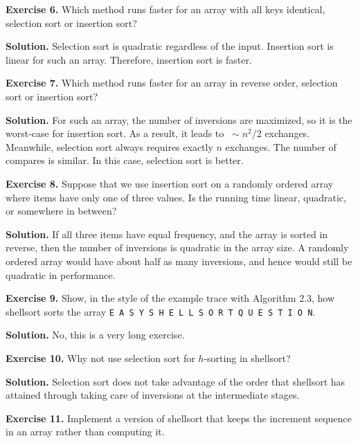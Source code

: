 \documentclass[12pt, a4paper]{article}
\newenvironment{ex}[2][Exercise]
{\par\medskip\noindent \textbf{#1 #2.}}
{\medskip}
\newenvironment{sol}[1][Solution]
{\par\medskip\noindent \textbf{#1.} }
{\medskip}
\begin{document}
	\begin{ex}{6}
		Which method runs faster for an array with all keys identical, selection sort or insertion sort?
	\end{ex}
	\begin{sol}
		Selection sort is quadratic regardless of the input. Insertion sort is linear for such
		an array. Therefore, insertion sort is faster.
	\end{sol}
	\begin{ex}{7}
		Which method runs faster for an array in reverse order, selection sort or insertion sort?
	\end{ex}
	\begin{sol}
		For such an array, the number of inversions are maximized, so it is the worst-case for
		insertion sort. As a result, it leads to $~\sim n^2/2$  exchanges. Meanwhile, selection
		sort always requires exactly $n$ exchanges. The number of compares is similar.
		In this case, selection sort is better.
	\end{sol}
	\begin{ex}{8}
		Suppose that we use insertion sort on a randomly ordered array where items have only one
		of three values. Is the running time linear, quadratic, or somewhere in between?
	\end{ex}
	\begin{sol}
		If all three items have equal frequency, and the array is sorted in reverse,
		then the number of inversions is quadratic in the array size. A randomly ordered
		array would have about half as many inversions, and hence would still be
		quadratic in performance.
	\end{sol}
	\begin{ex}{9}
		Show, in the style of the example trace with Algorithm 2.3, how shellsort sorts
		the array \texttt{E A S Y S H E L L S O R T Q U E S T I O N}.
	\end{ex}
	\begin{sol}
		No, this is a very long exercise.
	\end{sol}
	\begin{ex}{10}
		Why not use selection sort for $h$-sorting in shellsort?
	\end{ex}
	\begin{sol}
		Selection sort does not take advantage of the order that shellsort has attained
		through taking care of inversions at the intermediate stages.
	\end{sol}
	\begin{ex}{11}
		Implement a version of shellsort that keeps the increment sequence in an array
		rather than computing it.
	\end{ex}
\end{document}
